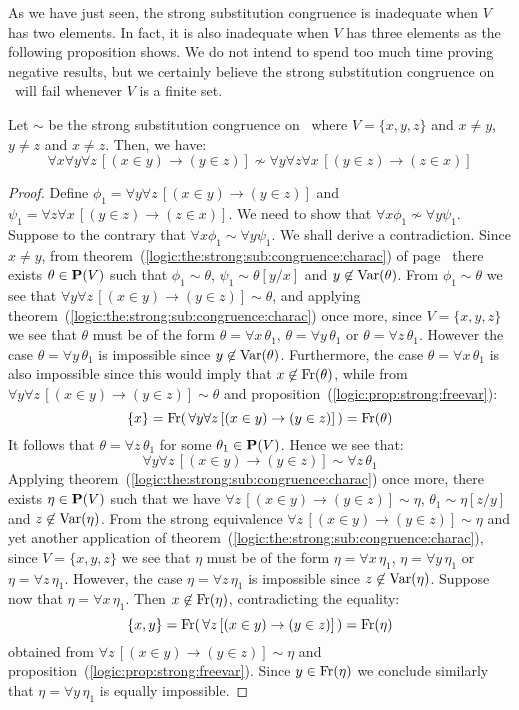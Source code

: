 As we have just seen, the strong substitution congruence is
inadequate when $V$ has two elements. In fact, it is also inadequate
when $V$ has three elements as the following proposition shows. We
do not intend to spend too much time proving negative results, but
we certainly believe the strong substitution congruence on \pv\ will
fail whenever $V$ is a finite set.

\begin{prop}\label{logic:prop:counter:strong:2}
Let $\sim$ be the strong substitution congruence on \pv\ where
$V=\{x,y,z\}$ and $x\neq y$, $y\neq z$ and $x\neq z$. Then, we have:
    \[
    \forall x\forall y\forall z\,[(x\in y)\to(y\in z)]\not\sim\forall
    y\forall z\forall x\,[(y\in z)\to(z\in x)]
    \]
\end{prop}
\begin{proof}
Define $\phi_{1}=\forall y\forall z\,[(x\in y)\to(y\in z)]$ and
$\psi_{1}=\forall z\forall x\,[(y\in z)\to(z\in x)]$. We need to
show that $\forall x\phi_{1}\not\sim\forall y\psi_{1}$. Suppose to
the contrary that $\forall x\phi_{1}\sim\forall y\psi_{1}$. We shall
derive a contradiction. Since $x\neq y$, from
theorem~(\ref{logic:the:strong:sub:congruence:charac}) of
page~\pageref{logic:the:strong:sub:congruence:charac} there exists
$\theta\in\mbox{${\bf P}(V)$}$ such that $\phi_{1}\sim\theta$,
$\psi_{1}\sim\theta[y/x]$ and $y\not\in\mbox{\rm Var}(\theta)$. From
$\phi_{1}\sim\theta$ we see that $\forall y\forall z\,[(x\in
y)\to(y\in z)]\sim\theta$, and applying
theorem~(\ref{logic:the:strong:sub:congruence:charac}) once more,
since $V=\{x,y,z\}$ we see that $\theta$ must be of the form
$\theta=\forall x\,\theta_{1}$, $\theta=\forall y\,\theta_{1}$ or
$\theta=\forall z\,\theta_{1}$. However the case $\theta=\forall
y\,\theta_{1}$ is impossible since $y\not\in\mbox{\rm Var}(\theta)$.
Furthermore, the case $\theta=\forall x\,\theta_{1}$ is also
impossible since this would imply that $x\not\in\mbox{\rm Fr}(\theta)$,
while from $\forall y\forall z\,[(x\in y)\to(y\in z)]\sim\theta$ and
proposition~(\ref{logic:prop:strong:freevar}):
    \[
    \{x\}=\mbox{\rm Fr}(\,\forall y\forall z\,[(x\in y)\to(y\in z)]\,)=\mbox{\rm Fr}(\theta)
    \]
It follows that $\theta=\forall z\,\theta_{1}$ for some
$\theta_{1}\in\mbox{${\bf P}(V)$}$. Hence we see that:
    \[
    \forall y\forall z\,[(x\in y)\to(y\in z)]\sim\forall z\,\theta_{1}
    \]
Applying theorem~(\ref{logic:the:strong:sub:congruence:charac}) once
more, there exists $\eta\in\mbox{${\bf P}(V)$}$ such that  we have $\forall
z\,[(x\in y)\to(y\in z)]\sim\eta$, $\theta_{1}\sim\eta[z/y]$ and
$z\not\in\mbox{\rm Var}(\eta)$. From the strong equivalence $\forall z\,[(x\in
y)\to(y\in z)]\sim\eta$ and yet another application of
theorem~(\ref{logic:the:strong:sub:congruence:charac}), since
$V=\{x,y,z\}$ we see that $\eta$ must be of the form $\eta=\forall
x\,\eta_{1}$, $\eta=\forall y\,\eta_{1}$ or $\eta=\forall
z\,\eta_{1}$. However, the case $\eta=\forall z\,\eta_{1}$ is
impossible since $z\not\in\mbox{\rm Var}(\eta)$. Suppose now that
$\eta=\forall x\,\eta_{1}$. Then $x\not\in\mbox{\rm Fr}(\eta)$,
contradicting the equality:
    \[
    \{x,y\}=\mbox{\rm Fr}(\,\forall z\,[(x\in y)\to(y\in z)]\,)=\mbox{\rm Fr}(\eta)
    \]
obtained from $\forall z\,[(x\in y)\to(y\in z)]\sim\eta$ and
proposition~(\ref{logic:prop:strong:freevar}). Since
$y\in\mbox{\rm Fr}(\eta)$ we conclude similarly that $\eta=\forall
y\,\eta_{1}$ is equally impossible.
\end{proof}
